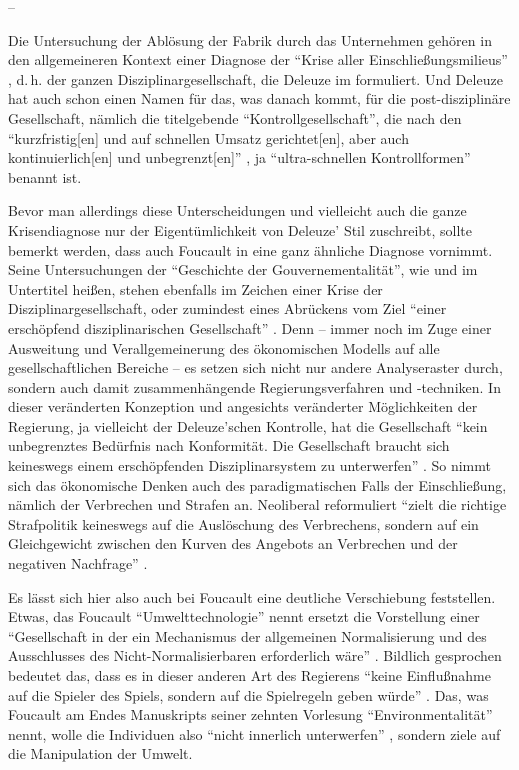 \documentclass[12pt,
               DIV13,
               paper=a4,
               twoside=false,
               onehalfspacing,
               bibliography=totoc,
               toc=graduated,
               draft,
               ]{scrartcl}
\newcommand{\pc}[2]{\parencite[#1]{#2}}
\begin{document}
--

Die Untersuchung der Ablösung der Fabrik durch das Unternehmen gehören
in den allgemeineren Kontext einer Diagnose der "`Krise aller
Einschließungsmilieus"' \pc{255}{ps}, d.\,h. der ganzen
Disziplinargesellschaft, die Deleuze im  formuliert. Und
Deleuze hat auch schon einen Namen für das, was danach kommt, für die
post-disziplinäre Gesellschaft, nämlich die titelgebende
"`Kontrollgesellschaft"', die nach den "`kurzfristig[en] und auf
schnellen Umsatz gerichtet[en], aber auch kontinuierlich[en] und
unbegrenzt[en]"' \pc{260}{ps}, ja "`ultra-schnellen Kontrollformen"'
\pc{255}{ps} benannt ist.

Bevor man allerdings diese Unterscheidungen und vielleicht auch die
ganze Krisendiagnose nur der Eigentümlichkeit von Deleuze' Stil
zuschreibt, sollte bemerkt werden, dass auch Foucault in \cite{gbp}
eine ganz ähnliche Diagnose vornimmt. Seine Untersuchungen der
"`Geschichte der Gouvernementalität"', wie \cite{stb} und \cite{gbp}
im Untertitel heißen, stehen ebenfalls im Zeichen einer Krise der
Disziplinargesellschaft, oder zumindest eines Abrückens vom Ziel
"`einer erschöpfend disziplinarischen Gesellschaft"' \pc{359}{gbp}.
Denn -- immer noch im Zuge einer Ausweitung und Verallgemeinerung des
ökonomischen Modells auf alle gesellschaftlichen Bereiche -- es setzen
sich nicht nur andere Analyseraster durch, sondern auch damit
zusammenhängende Regierungsverfahren und -techniken. In dieser
veränderten Konzeption und angesichts veränderter Möglichkeiten der
Regierung, ja vielleicht der Deleuze'schen Kontrolle, hat die
Gesellschaft "`kein unbegrenztes Bedürfnis nach Konformität. Die
Gesellschaft braucht sich keineswegs einem erschöpfenden
Disziplinarsystem zu unterwerfen"' \pc{354}{gbp}. So nimmt sich das
ökonomische Denken auch des paradigmatischen Falls der Einschließung,
nämlich der Verbrechen und Strafen an. Neoliberal reformuliert "`zielt
die richtige Strafpolitik keineswegs auf die Auslöschung des
Verbrechens, sondern auf ein Gleichgewicht zwischen den Kurven des
Angebots an Verbrechen und der negativen Nachfrage"' \pc{354}{gbp}.

Es lässt sich hier also auch bei Foucault eine deutliche Verschiebung
feststellen. Etwas, das Foucault "`Umwelttechnologie"' nennt
\pc{359}{gbp} ersetzt die Vorstellung einer "`Gesellschaft in der ein
Mechanismus der allgemeinen Normalisierung und des Ausschlusses des
Nicht-Normalisierbaren erforderlich wäre"' \pc{359}{gbp}. Bildlich
gesprochen bedeutet das, dass es in dieser anderen Art des Regierens
"`keine Einflußnahme auf die Spieler des Spiels, sondern auf die
Spielregeln geben würde"' \pc{359}{gbp}. Das, was Foucault am Endes
Manuskripts seiner zehnten Vorlesung "`Environmentalität"' \pc{Fn., S.
361}{gbp} nennt, wolle die Individuen also "`nicht innerlich
unterwerfen"' \pc{359}{gbp}, sondern ziele auf die Manipulation der
Umwelt.
\end{document}
